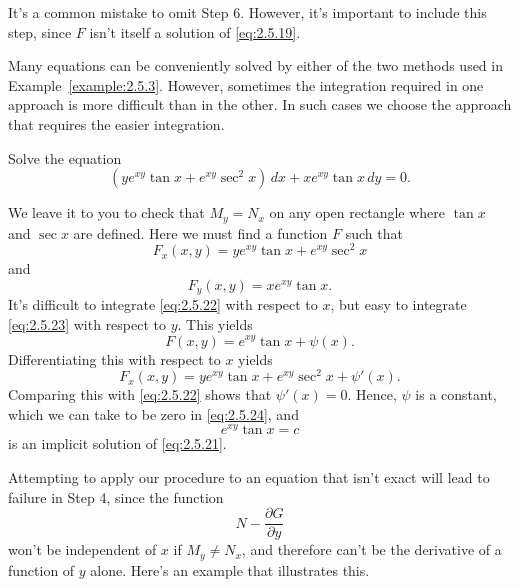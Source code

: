\documentclass{ximera}
\begin{document}
It's a common mistake to omit Step 6. However, it's important to
include this step, since $F$ isn't  itself a solution of
\eqref{eq:2.5.19}.

Many equations can be conveniently solved by either of the two methods
used in Example~\ref{example:2.5.3}. However, sometimes the integration
required in one approach is  more difficult than in the
other. In such cases we choose the approach that requires the easier integration.

\begin{example}\label{example:2.5.4}
 Solve the equation
\begin{equation}  \label{eq:2.5.21}
(ye^{xy} \tan x+e^{xy} \sec^2x)\,dx+xe^{xy} \tan x\,dy=0.
\end{equation}


\begin{explanation} We leave it to you to check that
$M_y=N_x$ on any open rectangle  where $\tan x$ and $\sec x$ are
defined. Here we must find a function $F$ such that
\begin{equation} \label{eq:2.5.22}
F_x(x,y)=ye^{xy} \tan x+e^{xy} \sec^2 x
\end{equation}
 and
\begin{equation}  \label{eq:2.5.23}
F_y(x,y)=xe^{xy} \tan x.
\end{equation}
 It's difficult to integrate \eqref{eq:2.5.22} with respect to $x$, but
easy to integrate \eqref{eq:2.5.23} with respect to $y$.  This yields
\begin{equation} \label{eq:2.5.24}
F(x,y)=e^{xy} \tan x+\psi (x).
\end{equation}
Differentiating this with respect to $x$ yields
$$
F_x(x,y)=ye^{xy}\tan x+e^{xy}\sec^2x+\psi'(x).
$$
 Comparing this with \eqref{eq:2.5.22} shows that  $\psi'(x)=0$.
Hence, $\psi$ is  a constant, which we can take to be zero in
\eqref{eq:2.5.24}, and
$$
e^{xy} \tan x=c
$$
is an implicit solution of \eqref{eq:2.5.21}.
\end{explanation}
\end{example}

Attempting to apply our procedure to an equation that isn't  exact
will lead to failure in  Step 4, since the function
$$
 N-\frac{\partial G}{\partial y}
$$
won't be independent of $x$ if $M_y\neq N_x$,
and therefore
can't be the derivative of a function of $y$ alone. Here's an example that
illustrates this.
\end{document}
